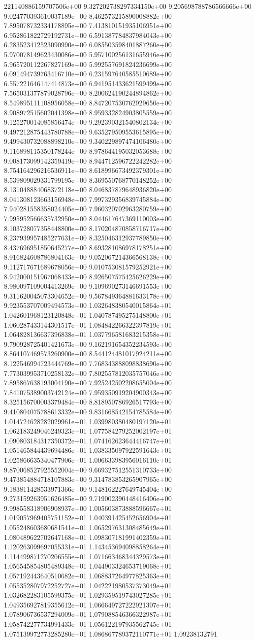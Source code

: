 221140886159707506e+00	9.327202738297334150e+00	9.205698788786566666e+00	9.024770393610037189e+00	8.462573215890008882e+00	7.895078732334178895e+00	7.413810151935106951e+00	6.952861822729192731e+00	6.591387784837984043e+00	6.283523412523090990e+00	6.085503598401887260e+00	5.970078149623430086e+00	5.957100256131655946e+00	5.965720112267827169e+00	5.992557691824236699e+00	6.091494739763416710e+00	6.231597640585510689e+00	6.557221646147414873e+00	6.941951433621599499e+00	7.565031377879028796e+00	8.200624190244894862e+00	8.549895111108956058e+00	8.847207530762929650e+00	8.908972515602041398e+00	8.959332824903805559e+00	9.125270014085856474e+00	9.292390321540802134e+00	9.497212875443780788e+00	9.635279509553615895e+00	9.499430732088898210e+00	9.340229897474106480e+00	9.116898115350178244e+00	8.978644195032053688e+00	9.008173099142359419e+00	8.944712596722242282e+00	8.754164296216536911e+00	8.618996673492379301e+00	8.539809029331799195e+00	8.369550768770148252e+00	8.131048884068372118e+00	8.046837879648936820e+00	8.041308123663156948e+00	7.997329356839745884e+00	7.940281558358024405e+00	7.960320702963280759e+00	7.995952566635732950e+00	8.044617647369110003e+00	8.103728077358448800e+00	8.170204870858716717e+00	8.237939957485277631e+00	8.325046312937789850e+00	8.437696951850645277e+00	8.693281086978178251e+00	8.916824608786804163e+00	9.052067214366568138e+00	9.112717671689678056e+00	9.010753081579252921e+00	8.942000151967068433e+00	8.926507575425626229e+00	8.980097109004413269e+00	9.109690273146691553e+00	9.311620045073304652e+00	9.567849364881633178e+00	9.923553707009494573e+00	1.032648380540015864e+01	1.042601968123120848e+01	1.040787495275148800e+01	1.060287433144301517e+01	1.084842266322397819e+01	1.064828136637396838e+01	1.037796581683215358e+01	9.790928725401421673e+00	9.162191654352234593e+00	8.864107469573260900e+00	8.544124481017924211e+00	8.122546994723444769e+00	7.768343888098838690e+00	7.773039953710258132e+00	7.802557812035757046e+00	7.895867638193004190e+00	7.925242502208655004e+00	7.841075389003742124e+00	7.959350919204900343e+00	8.325156700003379484e+00	8.818950786926517793e+00	9.410804075788613332e+00	9.831668542154785584e+00	1.014724628282029961e+01	1.039980380480197120e+01	1.062183249046249323e+01	1.077584279252002197e+01	1.090803184317350372e+01	1.074162623644416747e+01	1.051465844439694486e+01	1.038335097922591643e+01	1.025866635340477906e+01	1.006633983956016110e+01	9.870068527925552004e+00	9.669327512551310733e+00	9.473854884718107883e+00	9.314783853265907965e+00	9.183811428533971366e+00	9.148162227649745404e+00	9.273159263951626485e+00	9.719002390448416406e+00	9.998558318906908937e+00	1.005603873888596667e+01	1.019057969405751152e+01	1.040391425452656904e+01	1.055248603680681541e+01	1.065297631308485649e+01	1.080489622702647168e+01	1.098307181991402359e+01	1.120263099697055331e+01	1.143453694098858264e+01	1.114499871270206555e+01	1.071663468344329573e+01	1.056545854805489348e+01	1.044903324653719068e+01	1.057192443640510682e+01	1.068837264977825363e+01	1.055352807972252727e+01	1.042221980537373049e+01	1.032682283105599375e+01	1.029359519743027285e+01	1.049356927819355612e+01	1.066649727222921307e+01	1.078906736537294009e+01	1.079088546366322987e+01	1.058742277734991433e+01	1.056122197935562745e+01	1.075139972773285280e+01	1.086867789372110771e+01	1.09238132791